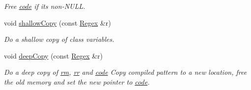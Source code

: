 \begin{DoxyCompactItemize}
\begin{DoxyCompactList}\small\item\em Free \hyperlink{classjpcre2_1_1Regex_a2742264206d8976c413b474b7bac4b2e}{code} if it\textquotesingle{}s non-\/\+N\+U\+LL. \end{DoxyCompactList}\item 
void \hyperlink{classjpcre2_1_1Regex_a24594d3bdb08b3795080c68019928f3a}{shallow\+Copy} (const \hyperlink{classjpcre2_1_1Regex}{Regex} \&r)\hypertarget{classjpcre2_1_1Regex_a24594d3bdb08b3795080c68019928f3a}{}\label{classjpcre2_1_1Regex_a24594d3bdb08b3795080c68019928f3a}

\begin{DoxyCompactList}\small\item\em Do a shallow copy of class variables. \end{DoxyCompactList}\item 
void \hyperlink{classjpcre2_1_1Regex_acaa5da5fc3ad903e3ecc724750214e07}{deep\+Copy} (const \hyperlink{classjpcre2_1_1Regex}{Regex} \&r)
\begin{DoxyCompactList}\small\item\em Do a deep copy of \hyperlink{classjpcre2_1_1Regex_a447925705d222dbbd8c7d60b98cc65f0}{rm}, \hyperlink{classjpcre2_1_1Regex_a5a7ac6c6288988079b8933b4b6637fab}{rr} and \hyperlink{classjpcre2_1_1Regex_a2742264206d8976c413b474b7bac4b2e}{code} Copy compiled pattern to a new location, free the old memory and set the new pointer to \hyperlink{classjpcre2_1_1Regex_a2742264206d8976c413b474b7bac4b2e}{code}. \end{DoxyCompactList}\end{DoxyCompactItemize}
